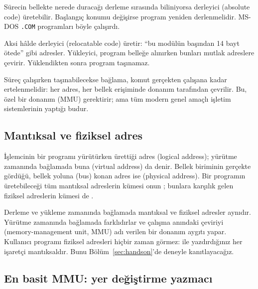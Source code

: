 \begin{description}[leftmargin=0pt,style=nextline,itemsep=0.3em]
  \item[Derleme zamanı (compile time)] Sürecin bellekte nerede duracağı derleme sırasında biliniyorsa derleyici  (absolute code) üretebilir. Başlangıç konumu değişirse program yeniden derlenmelidir. MS-DOS \texttt{.COM} programları böyle çalışırdı.
  \item[Yükleme zamanı (load time)] Aksi hâlde derleyici  (relocatable code) üretir: ``bu modülün başından 14 bayt ötede'' gibi adresler. Yükleyici, program belleğe alınırken bunları mutlak adreslere çevirir. Yüklendikten sonra program taşınamaz.
  \item[Yürütme zamanı (execution time)] Süreç çalışırken taşınabilecekse bağlama, komut gerçekten çalışana kadar ertelenmelidir: her adres, her bellek erişiminde donanım tarafından çevrilir. Bu, özel bir donanım (MMU) gerektirir; ama tüm modern genel amaçlı işletim sistemlerinin yaptığı budur.
\end{description}

\subsection{Mantıksal ve fiziksel adres}

İşlemcinin bir programı yürütürken ürettiği adres  (logical address); yürütme zamanında bağlamada buna  (virtual address) da denir. Bellek biriminin gerçekte gördüğü, bellek yoluna (bus) konan adres ise  (physical address). Bir programın üretebileceği tüm mantıksal adreslerin kümesi onun ; bunlara karşılık gelen fiziksel adreslerin kümesi de .

Derleme ve yükleme zamanında bağlamada mantıksal ve fiziksel adresler aynıdır. Yürütme zamanında bağlamada farklıdırlar ve çalışma anındaki çeviriyi  (memory-management unit, MMU) adı verilen bir donanım aygıtı yapar. Kullanıcı programı fiziksel adresleri hiçbir zaman görmez:  ile yazdırdığınız her işaretçi mantıksaldır. Bunu Bölüm~\ref{sec:handson}'de deneyle kanıtlayacağız.

\subsection{En basit MMU: yer değiştirme yazmacı}


